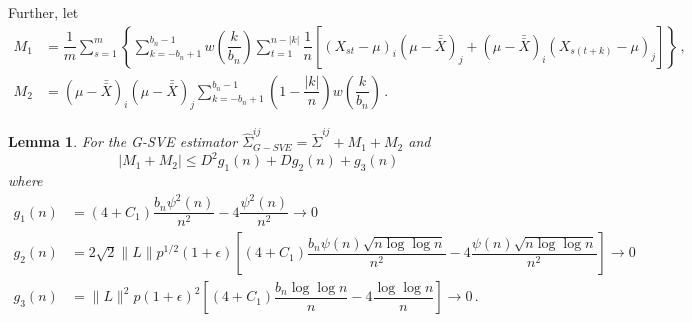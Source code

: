 \documentclass[11pt]{article}
\newtheorem{lemma}{Lemma}
\theoremstyle{remark}
\begin{document}
Further, let
\begin{align*}
  M_1 & = \dfrac{1}{m}\sum\limits_{s=1}^{m}\left\{\sum\limits_{k=-b_n+1}^{b_n-1}w\left(\dfrac{k}{b_n}\right)\sum\limits_{t=1}^{n-|k|}\dfrac{1}{n}\left[ \left(X_{st}-\mu \right)_i   \left(\mu-\bar{\bar{X}} \right)_j +    \left(\mu-\bar{\bar{X}} \right)_i  \left(X_{s(t+k)}-\mu \right)_j \right]\right\}\,, \\ 
M_2 &= \left(\mu-\bar{\bar{X}} \right)_i   \left(\mu-\bar{\bar{X}} \right)_j\sum\limits_{k=-b_n+1}^{b_n-1}\left(1-\dfrac{|k|}{n}\right)w\left(\dfrac{k}{b_n}\right)\,.
\end{align*}
\begin{lemma} \label{lemma:G-SVE_breakdown}
For the G-SVE estimator $\hat{\Sigma}_{G-SVE}^{ij} = \tilde{\Sigma}^{ij} + M_1 + M_2$ and 
\[
|M_1 + M_2| \leq D^2 g_1(n) + D g_2(n) + g_3(n)\,
\]
where
\begin{align*}
    g_1(n) &= (4+C_1)\dfrac{b_n \psi^2(n)}{n^2} - 4\dfrac{\psi^2(n)}{n^2} \to 0\\
    g_2(n) &= 2\sqrt{2}\|L\|p^{1/2}(1+\epsilon)\left[(4+C_1)\dfrac{b_n\psi(n)\sqrt{n\log \log n}}{n^2} - 4\dfrac{\psi(n)\sqrt{n\log \log n}}{n^2}\right] \to 0\\
    g_3(n) &= \|L\|^2 p (1+\epsilon)^2\left[(4+C_1)\dfrac{b_n \log\log n}{n} - 4 \dfrac{\log \log n}{n}\right] \to 0\,.
\end{align*}
\end{lemma}
\end{document}
